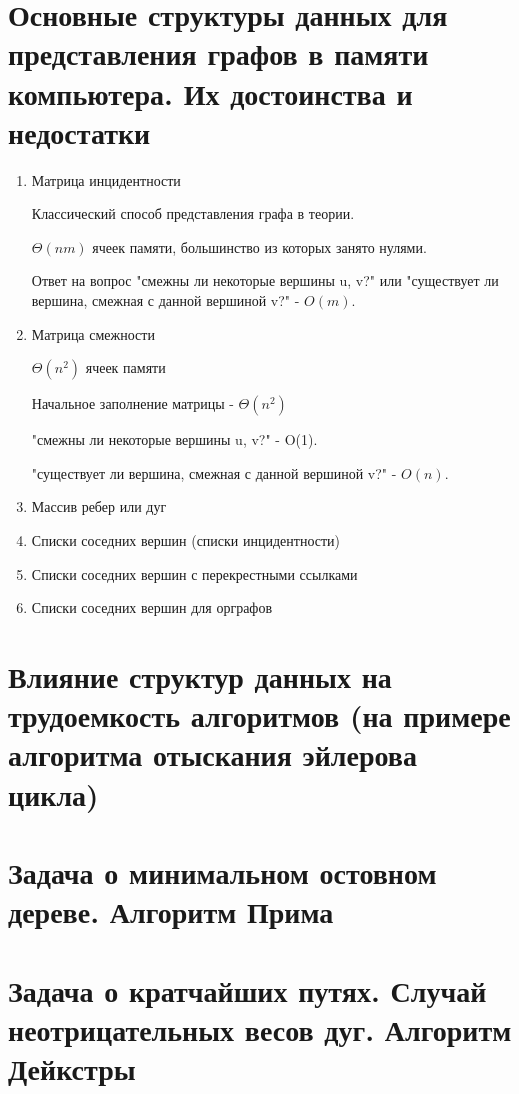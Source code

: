 \documentclass[a4paper]{article}
\theoremstyle{definition}
\theoremstyle{remark}
\begin{document}
\begin{multicols*}{2}
    \section{Основные структуры данных для представления графов в памяти компьютера. Их 
    достоинства и недостатки}
    \begin{enumerate}
        \item Матрица инцидентности
        
        Классический способ представления графа в теории.

        $\Theta(nm)$ ячеек памяти, большинство из которых занято нулями.

        Ответ на вопрос "смежны ли некоторые вершины u, v?" или "существует ли вершина, смежная с данной вершиной v?" - $O(m)$.
        \item Матрица смежности

        $\Theta(n^2)$ ячеек памяти

        Начальное заполнение матрицы - $\Theta(n^2)$

        "смежны ли некоторые вершины u, v?" - O(1).

        "существует ли вершина, смежная с данной вершиной v?" - $O(n)$.
        \item Массив ребер или дуг
        \item Списки соседних вершин (списки инцидентности)
        \item Списки соседних вершин с перекрестными ссылками
        \item Списки соседних вершин для орграфов
    \end{enumerate}
    \section{Влияние структур данных на трудоемкость алгоритмов (на примере алгоритма 
    отыскания эйлерова цикла)}
    \section{Задача о минимальном остовном дереве. Алгоритм Прима}
    \section{Задача о кратчайших путях. Случай неотрицательных весов дуг. Алгоритм Дейкстры}

\end{multicols*}
\end{document}
